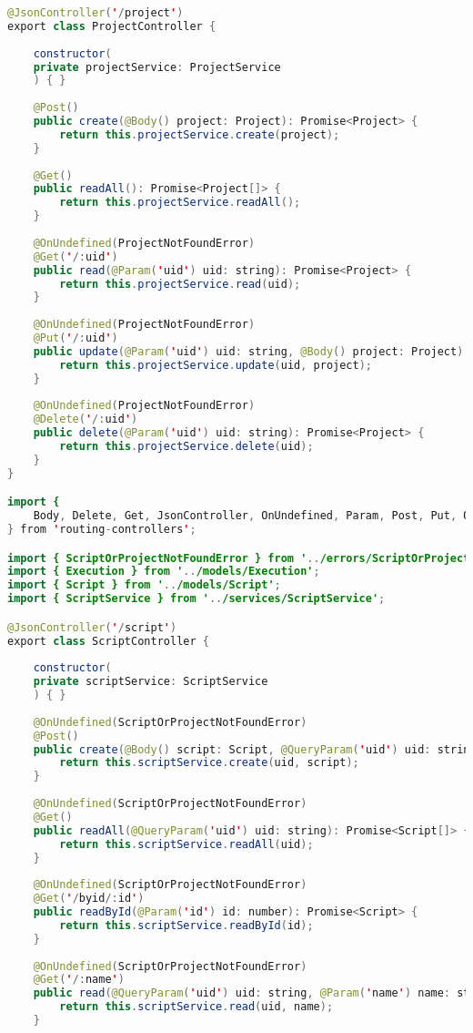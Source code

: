 \begin{lstlisting}[language=java]
@JsonController('/project')
export class ProjectController {
	
	constructor(
	private projectService: ProjectService
	) { }
	
	@Post()
	public create(@Body() project: Project): Promise<Project> {
		return this.projectService.create(project);
	}
	
	@Get()
	public readAll(): Promise<Project[]> {
		return this.projectService.readAll();
	}
	
	@OnUndefined(ProjectNotFoundError)
	@Get('/:uid')
	public read(@Param('uid') uid: string): Promise<Project> {
		return this.projectService.read(uid);
	}
	
	@OnUndefined(ProjectNotFoundError)
	@Put('/:uid')
	public update(@Param('uid') uid: string, @Body() project: Project): Promise<Project> {
		return this.projectService.update(uid, project);
	}
	
	@OnUndefined(ProjectNotFoundError)
	@Delete('/:uid')
	public delete(@Param('uid') uid: string): Promise<Project> {
		return this.projectService.delete(uid);
	}
}

import {
	Body, Delete, Get, JsonController, OnUndefined, Param, Post, Put, QueryParam
} from 'routing-controllers';

import { ScriptOrProjectNotFoundError } from '../errors/ScriptOrProjectNotFoundError';
import { Execution } from '../models/Execution';
import { Script } from '../models/Script';
import { ScriptService } from '../services/ScriptService';

@JsonController('/script')
export class ScriptController {
	
	constructor(
	private scriptService: ScriptService
	) { }
	
	@OnUndefined(ScriptOrProjectNotFoundError)
	@Post()
	public create(@Body() script: Script, @QueryParam('uid') uid: string): Promise<Script> {
		return this.scriptService.create(uid, script);
	}
	
	@OnUndefined(ScriptOrProjectNotFoundError)
	@Get()
	public readAll(@QueryParam('uid') uid: string): Promise<Script[]> {
		return this.scriptService.readAll(uid);
	}
	
	@OnUndefined(ScriptOrProjectNotFoundError)
	@Get('/byid/:id')
	public readById(@Param('id') id: number): Promise<Script> {
		return this.scriptService.readById(id);
	}
	
	@OnUndefined(ScriptOrProjectNotFoundError)
	@Get('/:name')
	public read(@QueryParam('uid') uid: string, @Param('name') name: string): Promise<Script> {
		return this.scriptService.read(uid, name);
	}
	

\end{lstlisting}
